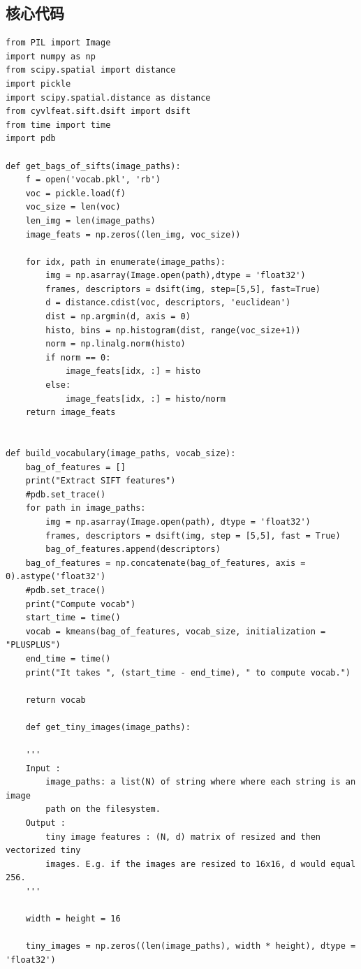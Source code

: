 \documentclass{article}
\begin{document}
\subsection{核心代码}
\begin{lstlisting}
from PIL import Image
import numpy as np
from scipy.spatial import distance
import pickle
import scipy.spatial.distance as distance
from cyvlfeat.sift.dsift import dsift
from time import time
import pdb

def get_bags_of_sifts(image_paths):
    f = open('vocab.pkl', 'rb')
    voc = pickle.load(f)
    voc_size = len(voc)
    len_img = len(image_paths)
    image_feats = np.zeros((len_img, voc_size))
    
    for idx, path in enumerate(image_paths):
        img = np.asarray(Image.open(path),dtype = 'float32')
        frames, descriptors = dsift(img, step=[5,5], fast=True)
        d = distance.cdist(voc, descriptors, 'euclidean')
        dist = np.argmin(d, axis = 0)
        histo, bins = np.histogram(dist, range(voc_size+1))
        norm = np.linalg.norm(histo)
        if norm == 0:
            image_feats[idx, :] = histo
        else:
            image_feats[idx, :] = histo/norm
    return image_feats


def build_vocabulary(image_paths, vocab_size):
    bag_of_features = []
    print("Extract SIFT features")
    #pdb.set_trace()
    for path in image_paths:
        img = np.asarray(Image.open(path), dtype = 'float32')
        frames, descriptors = dsift(img, step = [5,5], fast = True)
        bag_of_features.append(descriptors)
    bag_of_features = np.concatenate(bag_of_features, axis = 0).astype('float32')
    #pdb.set_trace()
    print("Compute vocab")
    start_time = time()
    vocab = kmeans(bag_of_features, vocab_size, initialization = "PLUSPLUS")
    end_time = time()
    print("It takes ", (start_time - end_time), " to compute vocab.")

    return vocab

    def get_tiny_images(image_paths):

    '''
    Input : 
        image_paths: a list(N) of string where where each string is an image 
        path on the filesystem.
    Output :
        tiny image features : (N, d) matrix of resized and then vectorized tiny
        images. E.g. if the images are resized to 16x16, d would equal 256.
    '''
    
    width = height = 16
    
    tiny_images = np.zeros((len(image_paths), width * height), dtype = 'float32')
    

\end{lstlisting}
\end{document}
